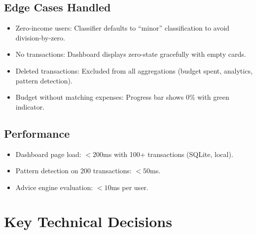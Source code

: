 \documentclass[12pt,a4paper]{article}
\begin{document}
\subsection{Edge Cases Handled}
\begin{itemize}
  \item Zero-income users: Classifier defaults to ``minor'' classification to avoid division-by-zero.
  \item No transactions: Dashboard displays zero-state gracefully with empty cards.
  \item Deleted transactions: Excluded from all aggregations (budget spent, analytics, pattern detection).
  \item Budget without matching expenses: Progress bar shows 0\% with green indicator.
\end{itemize}

\subsection{Performance}
\begin{itemize}
  \item Dashboard page load: $< 200$ms with 100+ transactions (SQLite, local).
  \item Pattern detection on 200 transactions: $< 50$ms.
  \item Advice engine evaluation: $< 10$ms per user.
\end{itemize}

\section{Key Technical Decisions}
\end{document}
